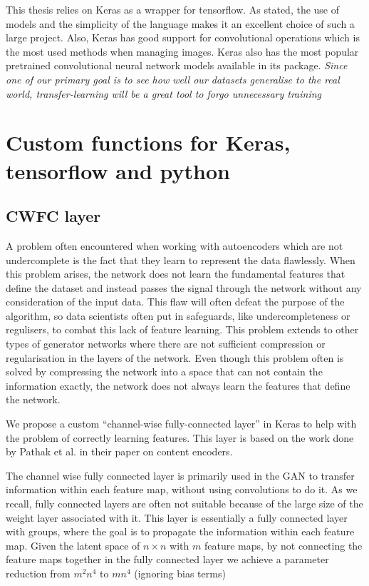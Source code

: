 This thesis relies on Keras as a wrapper for tensorflow. As stated, the use of models and the simplicity of the language makes it an excellent choice of such a large project. Also, Keras has good support for convolutional operations which is the most used methods when managing images. Keras also has the most popular pretrained convolutional neural network models available in its package. \textit{Since one of our primary goal is to see how well our datasets generalise to the real world, transfer-learning will be a great tool to forgo unnecessary training}





    
\section{Custom functions for Keras, tensorflow and python}
\subsection{CWFC layer}
A problem often encountered when working with autoencoders which are not undercomplete is the fact that they learn to represent the data flawlessly. \cite{OvercompleteAE} 
When this problem arises, the network does not learn the fundamental features that define the dataset and instead passes the signal through the network without any consideration of the input data.
This flaw will often defeat the purpose of the algorithm, so data scientists often put in safeguards, like undercompleteness or regulisers, to combat this lack of feature learning. 
This problem extends to other types of generator networks where there are not sufficient compression or regularisation in the layers of the network.
Even though this problem often is solved by compressing the network into a space that can not contain the information exactly, the network does not always learn the features that define the network. 

We propose a custom ``channel-wise fully-connected layer'' in Keras to help with the problem of correctly learning features. This layer is based on the work done by Pathak et al. in their paper on content encoders\cite{Pathak_2016}.

The channel wise fully connected layer is primarily used in the GAN to transfer information within each feature map, without using convolutions to do it. As we recall, fully connected layers are often not suitable because of the large size of the weight layer associated with it. This layer is essentially a fully connected layer with groups, where the goal is to propagate the information within each feature map.
Given the latent space of $n \times n$ with $m$ feature maps, by not connecting the feature maps together in the fully connected layer we achieve a parameter reduction from $m^2n^4$ to $mn^4$ (ignoring bias terms) \cite{Pathak_2016}

